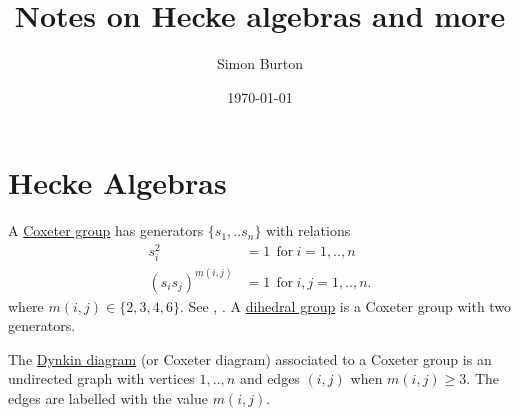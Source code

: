 \documentclass[12pt]{article}
\begin{document}
\title{Notes on Hecke algebras and more}

\author{Simon Burton}

\date{\today}


\maketitle




\def\Complex{\mathbb{C}}
\def\C{\mathbb{C}}
\def\R{\mathbb{R}}
\def\Z{\mathbb{Z}}
\def\Ham{H} 
\def\Pauli{\mathcal{P}}
\def\Spec{\mbox{Spec}}
\def\Proveit{{\it (Proof??)}}
\def\GL{\mathrm{GL}}
\def\half{\frac{1}{2}}
\def\Im{\mbox{im}}
\def\Ker{\mbox{ker}}
\def\Field{\mathcal{F}}
\def\Defn#1{\underline{#1}}

\newcommand{\ket}[1]{|{#1}\rangle}
\newcommand{\expect}[1]{\langle{#1}\rangle}
\newcommand{\bra}[1]{\langle{#1}|}
\newcommand{\ketbra}[2]{\ket{#1}\!\bra{#2}}
\newcommand{\braket}[2]{\langle{#1}|{#2}\rangle}


%
%

\section{Hecke Algebras}

A \Defn{Coxeter group}
has generators $\{s_1, .. s_n \}$
with relations
\begin{align*}
    s_i^2 &= 1 \ \ \mbox{for}\ i=1,..,n\\
    (s_i s_j)^{m(i,j)} &= 1\ \ \mbox{for}\ i,j=1,..,n.
\end{align*}
where $m(i,j)\in\{2,3,4,6\}.$
See \cite{Garrett1997}, \cite{Baez2010}.
A \Defn{dihedral group}
is a Coxeter group with two generators.

The \Defn{Dynkin diagram} (or Coxeter diagram)
associated to a Coxeter group is an undirected graph
with vertices $1,..,n$ and edges $(i,j)$ when $m(i,j)\ge 3.$
The edges are labelled with the value $m(i,j)$.
\end{document}
